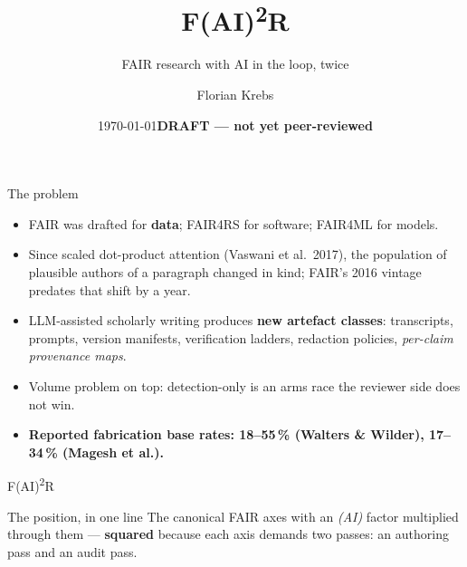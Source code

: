 \documentclass[aspectratio=169,11pt]{beamer}
\title{F(AI)\textsuperscript{2}R}
\subtitle{FAIR research with AI in the loop, twice}
\author{Florian Krebs}
\institute{%
  ORCID: \href{https://orcid.org/0000-0001-6033-801X}{0000-0001-6033-801X}\\
  DLR Zentrum f\"ur Leichtbauproduktionstechnologie (ZLP), Augsburg\\
  Helmholtz \textperiodcentered{} NFDI4Ing \textperiodcentered{} HMC%
}
\date{\today \quad\textcolor{dlrAccent}{\textbf{DRAFT --- not yet peer-reviewed}}}
\begin{document}
\begin{frame}[plain]
  \titlepage
  \vspace{-1.0em}
  \begin{center}
    \resizebox{0.70\textwidth}{!}{}
  \end{center}
\end{frame}

\begin{frame}{The problem}
  \begin{itemize}
    \item FAIR was drafted for \textbf{data}; FAIR4RS for software; FAIR4ML for models.
    \item Since scaled dot-product attention (Vaswani et al.\ 2017), the
          population of plausible authors of a paragraph changed in kind;
          FAIR's 2016 vintage predates that shift by a year.
    \item LLM-assisted scholarly writing produces \textbf{new artefact classes}:
          transcripts, prompts, version manifests, verification ladders,
          redaction policies, \emph{per-claim provenance maps}.
    \item Volume problem on top: detection-only is an arms race the reviewer side does not win.
    \item \textbf{Reported fabrication base rates: 18--55\,\% (Walters \& Wilder), 17--34\,\% (Magesh et al.).}
  \end{itemize}
\end{frame}


\begin{frame}{F(AI)\textsuperscript{2}R}
  \begin{block}{The position, in one line}
    The canonical FAIR axes with an \emph{(AI)} factor multiplied through them ---
    \textbf{squared} because each axis demands two passes: an authoring pass and an audit pass.
  \end{block}
\end{frame}
\end{document}
